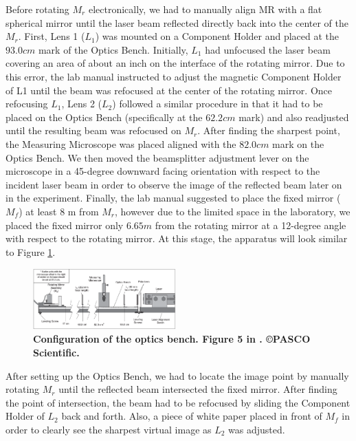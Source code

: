 \documentclass[twocolumn]{article}
\begin{document}
		Before rotating $M_r$ electronically, we had to manually align MR with a flat spherical mirror until the laser beam reflected directly back into the center of the $M_r$. 
		First, Lens 1 ($L_1$) was mounted on a Component Holder and placed at the $93.0 cm$ mark of the Optics Bench. 
		Initially, $L_1$ had unfocused the laser beam covering an area of about an inch on the interface of the rotating mirror.  
		Due to this error, the lab manual instructed to adjust the magnetic Component Holder of L1 until the beam was refocused at the center of the rotating mirror. 
		Once refocusing $L_1$, Lens 2 ($L_2$) followed a similar procedure in that it had to be placed on the Optics Bench (specifically at the $62.2 cm$ mark) and also readjusted until the resulting beam was refocused on $M_r$.  
		After finding the sharpest point, the Measuring Microscope was placed aligned with the $82.0 cm$ mark on the Optics Bench.  
		We then moved the beamsplitter adjustment lever on the microscope in a 45-degree downward facing orientation with respect to the incident laser beam in order to observe the image of the reflected beam later on in the experiment. 
		Finally, the lab manual suggested to place the fixed mirror ($M_f$) at least 8 m from $M_r$, however due to the limited space in the laboratory, we placed the fixed mirror only $6.65 m$ from the rotating mirror at a 12-degree angle with respect to the rotating mirror. 
		At this stage, the apparatus will look similar to Figure \ref{fig:EquipConfig}.
		\begin{figure}[!ht]
			\centering
			\includegraphics[width=0.49\textwidth]{Images/PASCO_EquipmentAlignment.png}
			\caption{\textbf{Configuration of the optics bench. Figure 5 in \cite{lee_instruction_????}. \copyright PASCO Scientific.}}
			\label{fig:EquipConfig}
		\end{figure}
		
		After setting up the Optics Bench, we had to locate the image point by manually rotating $M_r$ until the reflected beam intersected the fixed mirror.  
		After finding the point of intersection, the beam had to be refocused by sliding the Component Holder of $L_2$ back and forth.  
		Also, a piece of white paper placed in front of $M_f$ in order to clearly see the sharpest virtual image as $L_2$ was adjusted.
		
\end{document}
